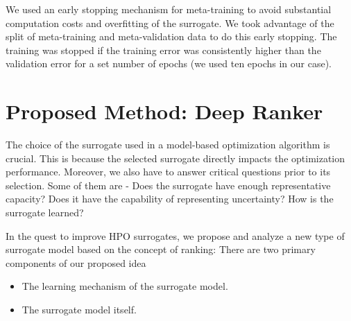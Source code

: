\documentclass[12pt, twoside, ngerman]{report}
\begin{document}
We used an early stopping mechanism for meta-training to avoid substantial computation costs and overfitting of the surrogate.
We took advantage of the split of meta-training and meta-validation data to do this early stopping.
The training was stopped if the training error was consistently higher than the validation error for a set number of epochs (we used ten epochs in our case).
 

\chapter{Proposed Method: Deep Ranker}\label{chap:ProposedIdea}


The choice of the surrogate used in a model-based optimization algorithm is crucial. This is because the selected surrogate directly impacts the optimization performance.
Moreover, we also have to answer critical questions prior to its selection. Some of them are - Does the surrogate have enough representative capacity?
Does it have the capability of representing uncertainty?
How is the surrogate learned?

In the quest to improve HPO surrogates,  we propose and analyze a new type of surrogate model based on the concept of ranking:
There are two primary components of our proposed idea

\begin{itemize}
\item The learning mechanism of the surrogate model.
\item The surrogate model itself.
\end{itemize}
\end{document}
